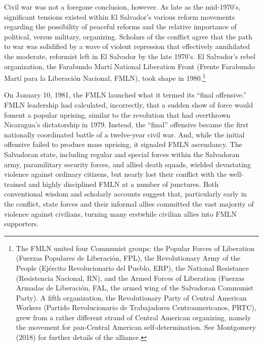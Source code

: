 \documentclass[11pt,]{article}
\let\rmarkdownfootnote\footnote%
\def\footnote{\protect\rmarkdownfootnote}
\begin{document}
Civil war was not a foregone conclusion, however. As late as the
mid-1970's, significant tensions existed within El Salvador's various
reform movements regarding the possibility of peaceful reforms and the
relative importance of political, versus military, organizing. Scholars
of the conflict agree that the path to war was solidified by a wave of
violent repression that effectively annihilated the moderate, reformist
left in El Salvador by the late 1970's. El Salvador's rebel
organization, the Farabundo Martí National Liberation Front (Frente
Farabundo Martí para la Liberación Nacional, FMLN), took shape in
1980.\footnote{The FMLN united four Communist groups: the Popular Forces
  of Liberation (Fuerzas Populares de Liberación, FPL), the
  Revolutionary Army of the People (Ejército Revolucionario del Pueblo,
  ERP), the National Resistance (Resistencia Nacional, RN), and the
  Armed Forces of Liberation (Fuerzas Armadas de Liberación, FAL, the
  armed wing of the Salvadoran Communist Party). A fifth organization,
  the Revolutionary Party of Central American Workers (Partido
  Revolucionario de Trabajadores Centroamericanos, PRTC), grew from a
  rather different strand of Central American organizing, namely the
  movement for pan-Central American self-determination. See Montgomery
  (2018) for further details of the alliance.}

On January 10, 1981, the FMLN launched what it termed its ``final
offensive.'' FMLN leadership had calculated, incorrectly, that a sudden
show of force would foment a popular uprising, similar to the revolution
that had overthrown Nicaragua's dictatorship in 1979. Instead, the
``final'' offensive became the first nationally coordinated battle of a
twelve-year civil war. And, while the initial offensive failed to
produce mass uprising, it signaled FMLN ascendancy. The Salvadoran
state, including regular and special forces within the Salvadoran army,
paramilitary security forces, and allied death squads, wielded
devastating violence against ordinary citizens, but nearly lost their
conflict with the well-trained and highly disciplined FMLN at a number
of junctures. Both conventional wisdom and scholarly accounts suggest
that, particularly early in the conflict, state forces and their
informal allies committed the vast majority of violence against
civilians, turning many erstwhile civilian allies into FMLN supporters.
\end{document}
